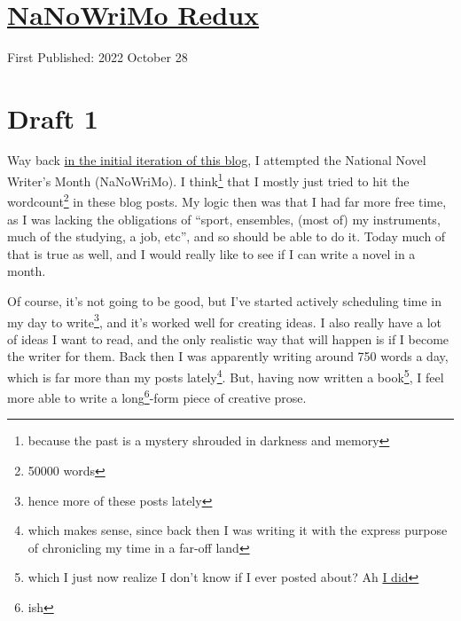 \documentclass[12pt]{article}[titlepage]
\newcommand{\say}[1]{``#1''}
\newcommand{\1}{\={a}}
\newcommand{\2}{\={e}}
\newcommand{\3}{\={\i}}
\newcommand{\4}{\=o}
\newcommand{\5}{\=u}
\newcommand{\6}{\={A}}
\renewcommand{\,}{\textsuperscript{,}}
\begin{document}

\doublespacing
\section{\href{nanowrimo-2.html}{NaNoWriMo Redux}}
First Published: 2022 October 28
\section{Draft 1}
Way back \href{nanowrimo.tex}{in the initial iteration of this blog}, I attempted the National Novel Writer's Month (NaNoWriMo).
I think\footnote{because the past is a mystery shrouded in darkness and memory} that I mostly just tried to hit the wordcount\footnote{50000 words} in these blog posts.
My logic then was that I had far more free time, as I was lacking the obligations of \say{sport, ensembles, (most of) my instruments, much of the studying, a job, etc}, and so should be able to do it.
Today much of that is true as well, and I would really like to see if I can write a novel in a month.

Of course, it's not going to be good, but I've started actively scheduling time in my day to write\footnote{hence more of these posts lately}, and it's worked well for creating ideas.
I also really have a lot of ideas I want to read, and the only realistic way that will happen is if I become the writer for them.
Back then I was apparently writing around 750 words a day, which is far more than my posts lately\footnote{which makes sense, since back then I was writing it with the express purpose of chronicling my time in a far-off land}.
But, having now written a book\footnote{which I just now realize I don't know if I ever posted about? Ah \href{reflection-july-2022.html}{I did}}, I feel more able to write a long\footnote{ish}-form piece of creative prose.
\end{document}
